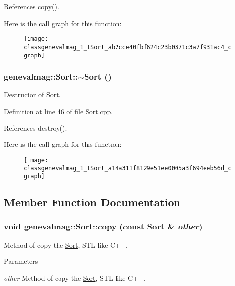 References copy().



Here is the call graph for this function:\nopagebreak
\begin{figure}[H]
\begin{center}
\leavevmode
\texttt{[image: classgenevalmag\_1\_1Sort\_ab2cce40fbf624c23b0371c3a7f931ac4\_cgraph]}
\end{center}
\end{figure}


\hypertarget{classgenevalmag_1_1Sort_a14a311f8129e51ee0005a3f694eeb56d}{
\subsubsection[{$\sim$Sort}]{\setlength{\rightskip}{0pt plus 5cm}genevalmag::Sort::$\sim$Sort ()}}
\label{classgenevalmag_1_1Sort_a14a311f8129e51ee0005a3f694eeb56d}
Destructor of \hyperlink{classgenevalmag_1_1Sort}{Sort}. 

Definition at line 46 of file Sort.cpp.



References destroy().



Here is the call graph for this function:\nopagebreak
\begin{figure}[H]
\begin{center}
\leavevmode
\texttt{[image: classgenevalmag\_1\_1Sort\_a14a311f8129e51ee0005a3f694eeb56d\_cgraph]}
\end{center}
\end{figure}




\subsection{Member Function Documentation}
\hypertarget{classgenevalmag_1_1Sort_ab9686f0d43855db1167b7cf634d9d1fa}{
\subsubsection[{copy}]{\setlength{\rightskip}{0pt plus 5cm}void genevalmag::Sort::copy (const {\bf Sort} \& {\em other})}}
\label{classgenevalmag_1_1Sort_ab9686f0d43855db1167b7cf634d9d1fa}
Method of copy the \hyperlink{classgenevalmag_1_1Sort}{Sort}, STL-\/like C++. 
\begin{DoxyParams}{Parameters}
\item[{\em other}]Method of copy the \hyperlink{classgenevalmag_1_1Sort}{Sort}, STL-\/like C++. \end{DoxyParams}


